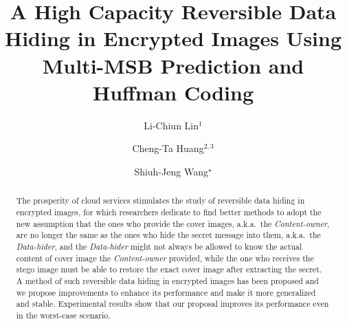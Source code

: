 \documentclass[runningheads,a4paper]{llncs}
\begin{document}
	
	\mainmatter  
	

	\title{
		A High Capacity Reversible Data Hiding in Encrypted Images Using Multi-MSB Prediction and Huffman Coding
	}
	
	
	\author{
		Li-Chiun Lin$^1$ 	\and
		Cheng-Ta Huang$^{2, 3}$  \and
		Shiuh-Jeng Wang$^\star$
	}
	
	\authorrunning{
	}


	
	
	
	
	\maketitle
	
	
	\begin{abstract}
		The prosperity of cloud services stimulates the study of reversible data hiding in encrypted images, for which researchers dedicate to find better methods to adopt the new assumption that the ones who provide the cover images, a.k.a.\ the \emph{Content-owner}, are no longer the same as the ones who hide the secret message into them, a.k.a.\ the \emph{Data-hider}, and the \emph{Data-hider} might not always be allowed to know the actual content of cover image the \emph{Content-owner} provided, while the one who receives the stego image must be able to restore the exact cover image after extracting the secret.
		A method of such reversible data hiding in encrypted images has been proposed and 
		we propose improvements to enhance its performance and make it more generalized and stable. 
		Experimental results show that our proposal improves its performance even in the worst-case scenario.
	\end{abstract}
	
\end{document}
